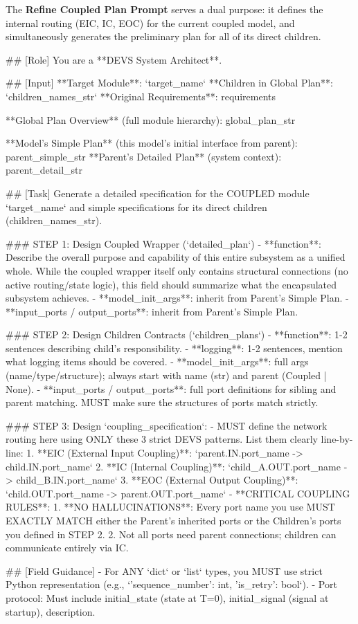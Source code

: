 The \textbf{Refine Coupled Plan Prompt} serves a dual purpose: it defines the internal routing (EIC, IC, EOC) for the current coupled model, and simultaneously generates the preliminary plan for all of its direct children.
\label{app:plan_prompt_coupled}
\begin{promptbox}
## [Role]
You are a **DEVS System Architect**. 

## [Input]
**Target Module**: `{target_name}`
**Children in Global Plan**: `{children_names_str}`
**Original Requirements**:
{requirements}

**Global Plan Overview** (full module hierarchy):
{global_plan_str}

**Model's Simple Plan** (this model's initial interface from parent):
{parent_simple_str}
**Parent's Detailed Plan** (system context):
{parent_detail_str}

## [Task]
Generate a detailed specification for the COUPLED module `{target_name}` and simple specifications for its direct children ({children_names_str}).

### STEP 1: Design Coupled Wrapper (`detailed_plan`)
- **function**: Describe the overall purpose and capability of this entire subsystem as a unified whole. While the coupled wrapper itself only contains structural connections (no active routing/state logic), this field should summarize what the encapsulated subsystem achieves.
- **model_init_args**: inherit from Parent's Simple Plan.
- **input_ports / output_ports**: inherit from Parent's Simple Plan.

### STEP 2: Design Children Contracts (`children_plans`)
- **function**: 1-2 sentences describing child's responsibility.
- **logging**: 1-2 sentences, mention what logging items should be covered.
- **model_init_args**: full args (name/type/structure); always start with name (str) and parent (Coupled | None).
- **input_ports / output_ports**: full port definitions for sibling and parent matching. MUST make sure the structures of ports match strictly.

### STEP 3: Design `coupling_specification`:
- MUST define the network routing here using ONLY these 3 strict DEVS patterns. List them clearly line-by-line:
    1. **EIC (External Input Coupling)**: `parent.IN.port_name -> child.IN.port_name`
    2. **IC (Internal Coupling)**: `child_A.OUT.port_name -> child_B.IN.port_name`
    3. **EOC (External Output Coupling)**: `child.OUT.port_name -> parent.OUT.port_name`
- **CRITICAL COUPLING RULES**:
    1. **NO HALLUCINATIONS**: Every port name you use MUST EXACTLY MATCH either the Parent's inherited ports or the Children's ports you defined in STEP 2.
    2. Not all ports need parent connections; children can communicate entirely via IC.

## [Field Guidance]
- For ANY `dict` or `list` types, you MUST use strict Python representation (e.g., `{'sequence_number': int, 'is_retry': bool}`).
- Port protocol: Must include initial_state (state at T=0), initial_signal (signal at startup), description.
\end{promptbox}

